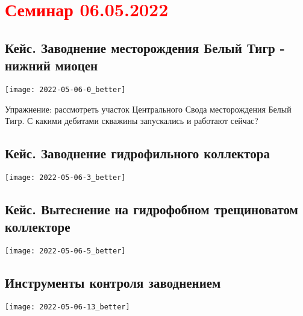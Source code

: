 \documentclass[main.tex]{subfiles}
\begin{document}
\section{\textcolor{red}{Семинар 06.05.2022}}

\subsection{Кейс. Заводнение месторождения Белый Тигр - нижний миоцен}

\texttt{[image: 2022-05-06-0\_better]}



Упражнение: рассмотреть участок Центрального Свода месторождения Белый Тигр. С какими дебитами скважины запускались и работают сейчас?

\subsection{Кейс. Заводнение гидрофильного коллектора}

\texttt{[image: 2022-05-06-3\_better]}


\subsection{Кейс. Вытеснение на гидрофобном трещиноватом коллекторе}

\texttt{[image: 2022-05-06-5\_better]}








\subsection{Инструменты контроля заводнением}

\texttt{[image: 2022-05-06-13\_better]}

\end{document}
